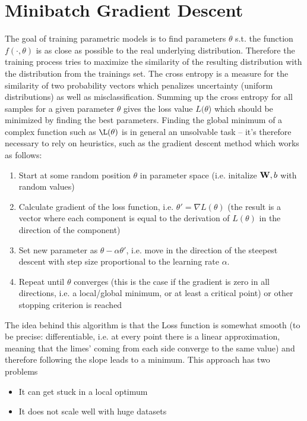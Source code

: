 \section{Minibatch Gradient Descent}
The goal of training parametric models is to find parameters $\theta$ s.t. the function $f(\cdot, \theta)$ is as close as possible to the real underlying distribution. Therefore the training process tries to maximize the similarity of the resulting distribution with the distribution from the trainings set.
The cross entropy is a measure for the similarity of two probability vectors which penalizes uncertainty (uniform distributions) as well as misclassification. Summing up the cross entropy for all samples for a given parameter $\theta$ gives the loss value $L(\theta$) which should be minimized by finding the best parameters. Finding the global minimum of a complex function such as $\L(\theta)$ is in general an unsolvable task -- it's therefore necessary to rely on heuristics, such as the gradient descent method which works as follows:
\begin{enumerate}
\item Start at some random position $\theta$ in parameter space (i.e. initalize $\textbf W, b$ with random values)
\item Calculate gradient of the loss function, i.e. $\theta' = \nabla L(\theta)$ (the result is a vector where each component is equal to the derivation of $L(\theta)$ in the direction of the component) 
\item Set new parameter as $\theta  - \alpha \theta'$, i.e. move in the direction of the steepest descent with step size proportional to the learning rate $\alpha$.
\item Repeat until $\theta$ converges (this is the case if the gradient is zero in all directions, i.e. a local/global minimum, or at least a critical point) or other stopping criterion is reached
\end{enumerate}
The idea behind this algorithm is that the Loss function is somewhat smooth (to be precise: differentiable, i.e. at every point there is a linear approximation, meaning that the limes' coming from each side converge to the same value) and therefore following the slope leads to a minimum. This approach has two problems
\begin{itemize}
\item It can get stuck in a local optimum
\item It does not scale well with huge datasets
\end{itemize}
